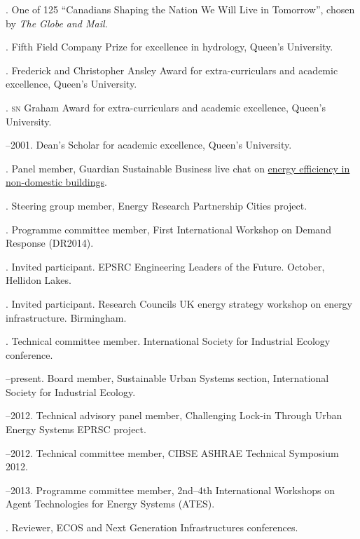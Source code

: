 \documentclass[11pt,a4paper]{article}
\begin{document}
. One of 125 ``Canadians Shaping the Nation We Will Live in Tomorrow'', chosen by \emph{The Globe and Mail}.

. Fifth Field Company Prize for excellence in hydrology, Queen's University.

. Frederick and Christopher Ansley Award for extra-curriculars and academic excellence, Queen's University.

. \textsc{sn} Graham Award for extra-curriculars and academic excellence, Queen's University.

--2001.  Dean's Scholar for academic excellence, Queen's University.

\bigskip 

\noindent{}%
. Panel member, Guardian Sustainable Business live chat on \href{http://www.theguardian.com/sustainable-business/energy-efficiency-commercial-properties-live-chat}{energy efficiency in non-domestic buildings}.

. Steering group member, Energy Research Partnership Cities project.


. Programme committee member, First International Workshop on Demand Response (DR2014).

. Invited participant.  EPSRC Engineering Leaders of the Future. October, Hellidon Lakes.

. Invited participant.  Research Councils UK energy strategy workshop on energy infrastructure.  Birmingham.

. Technical committee member.  International Society for Industrial Ecology conference.

--present. Board member, Sustainable Urban Systems section, International Society for Industrial Ecology.

--2012. Technical advisory panel member, Challenging Lock-in Through Urban Energy Systems EPRSC project.

--2012. Technical committee member, CIBSE ASHRAE Technical Symposium 2012.

--2013. Programme committee member, 2nd--4th International Workshops on Agent Technologies for Energy Systems (ATES).

. Reviewer, ECOS and Next Generation Infrastructures conferences.
\end{document}
